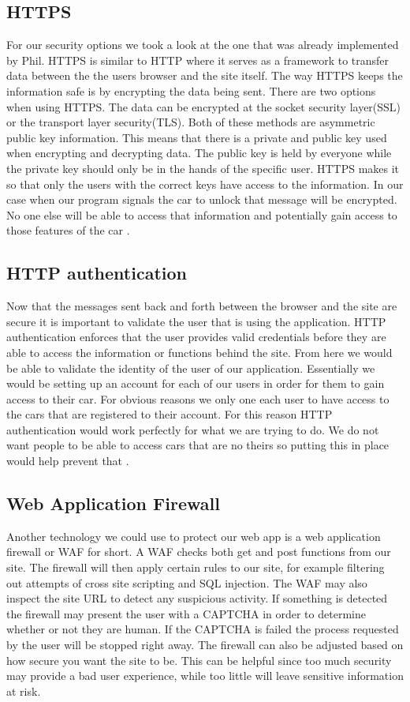 \documentclass[draftclsnofoot, onecolumn, compsoc, 10pt]{IEEEtran}
\begin{document}
\subsection{HTTPS}
For our security options we took a look at the one that was already implemented by Phil. HTTPS is similar to HTTP where it serves as a framework to transfer data between the the users browser and the site itself. The way HTTPS keeps the information safe is by encrypting the data being sent. There are two options when using HTTPS. The data can be encrypted at the socket security layer(SSL) or the transport layer security(TLS). Both of these methods are asymmetric public key information. This means that there is a private and public key used when encrypting and decrypting data. The public key is held by everyone while the private key should only be in the hands of the specific user. HTTPS makes it so that only the users with the correct keys have access to the information. In our case when our program signals the car to unlock that message will be encrypted. No one else will be able to access that information and potentially gain access to those features of the car \cite{HTTPS}.

\subsection{HTTP authentication}

Now that the messages sent back and forth between the browser and the site are secure it is important to validate the user that is using the application.  HTTP authentication enforces that the user provides valid credentials before they are able to access the information or functions behind the site. From here we would be able to validate the identity of the user of our application. Essentially we would be setting up an account for each of our users in order for them to gain access to their car. For obvious reasons we only one each user to have access to the cars that are registered to their account. For this reason HTTP authentication would work perfectly for what we are trying to do. We do not want people to be able to access cars that are no theirs so putting this in place would help prevent that \cite{HTTPA}.
 
 \subsection{Web Application Firewall}
Another technology we could use to protect our web app is a web application firewall or WAF for short. A WAF checks both get and post functions from our site. The firewall will then apply certain rules to our site, for example filtering out attempts of cross site scripting and SQL injection. The WAF may also inspect the site URL to detect any suspicious activity. If something is detected the firewall may present the user with a CAPTCHA in order to determine whether or not they are human. If the CAPTCHA is failed the process requested by the user will be stopped right away. The firewall can also be adjusted based on how secure you want the site to be. This can be helpful since too much security may provide a bad user experience, while too little will leave sensitive information at risk\cite{WAF}.
\end{document}
